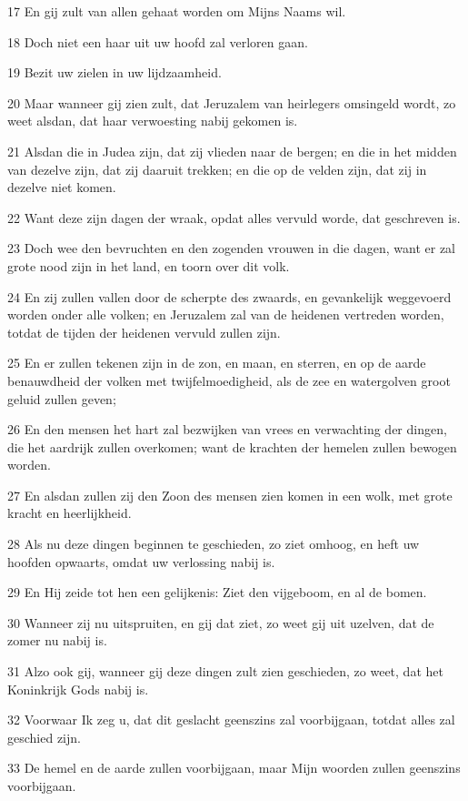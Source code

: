 \par 17 En gij zult van allen gehaat worden om Mijns Naams wil.
\par 18 Doch niet een haar uit uw hoofd zal verloren gaan.
\par 19 Bezit uw zielen in uw lijdzaamheid.
\par 20 Maar wanneer gij zien zult, dat Jeruzalem van heirlegers omsingeld wordt, zo weet alsdan, dat haar verwoesting nabij gekomen is.
\par 21 Alsdan die in Judea zijn, dat zij vlieden naar de bergen; en die in het midden van dezelve zijn, dat zij daaruit trekken; en die op de velden zijn, dat zij in dezelve niet komen.
\par 22 Want deze zijn dagen der wraak, opdat alles vervuld worde, dat geschreven is.
\par 23 Doch wee den bevruchten en den zogenden vrouwen in die dagen, want er zal grote nood zijn in het land, en toorn over dit volk.
\par 24 En zij zullen vallen door de scherpte des zwaards, en gevankelijk weggevoerd worden onder alle volken; en Jeruzalem zal van de heidenen vertreden worden, totdat de tijden der heidenen vervuld zullen zijn.
\par 25 En er zullen tekenen zijn in de zon, en maan, en sterren, en op de aarde benauwdheid der volken met twijfelmoedigheid, als de zee en watergolven groot geluid zullen geven;
\par 26 En den mensen het hart zal bezwijken van vrees en verwachting der dingen, die het aardrijk zullen overkomen; want de krachten der hemelen zullen bewogen worden.
\par 27 En alsdan zullen zij den Zoon des mensen zien komen in een wolk, met grote kracht en heerlijkheid.
\par 28 Als nu deze dingen beginnen te geschieden, zo ziet omhoog, en heft uw hoofden opwaarts, omdat uw verlossing nabij is.
\par 29 En Hij zeide tot hen een gelijkenis: Ziet den vijgeboom, en al de bomen.
\par 30 Wanneer zij nu uitspruiten, en gij dat ziet, zo weet gij uit uzelven, dat de zomer nu nabij is.
\par 31 Alzo ook gij, wanneer gij deze dingen zult zien geschieden, zo weet, dat het Koninkrijk Gods nabij is.
\par 32 Voorwaar Ik zeg u, dat dit geslacht geenszins zal voorbijgaan, totdat alles zal geschied zijn.
\par 33 De hemel en de aarde zullen voorbijgaan, maar Mijn woorden zullen geenszins voorbijgaan.
